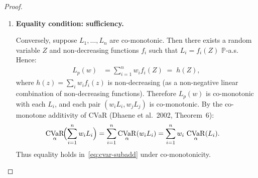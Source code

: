 \documentclass[12pt,openany]{book}
\newcommand{\Prob}{\mathbb{P}}
\newcommand{\bfw}{\mathbf{w}}
\DeclareMathOperator{\CVaR}{CVaR}
\numberwithin{equation}{chapter}
\theoremstyle{plain}
\theoremstyle{definition}
\theoremstyle{remark}
\def\bfw{w}%
\begin{document}
\begin{proof}
\begin{enumerate}[label=\textbf{Step \arabic*.}, leftmargin=*,
                  widest=Step 6., itemsep=1ex]
        Suppose equality holds in~\eqref{eq:cvar-subadd}, i.e.,
        \begin{equation}
          \CVaR_\alpha\!\bigl(L_p(\bfw)\bigr)
          \;=\; \sum_{i=1}^n w_i\,\CVaR_\alpha(L_i).
          \label{eq:cvar-equality}
        \end{equation}
        For any two integrable losses $X$, $Y$ with $w_X, w_Y > 0$,
        equality in~\eqref{eq:cvar-subadd-two} holds if and only if
        $X$ and $Y$ are co-monotonic (Theorem~6 of Dhaene et al.\
        2002).  Tracing back through the inductive
        step~\eqref{eq:cvar-inductive}, equality in each application
        of sub-additivity requires that $w_i L_i$ and
        $\sum_{j \neq i} w_j L_j$ are co-monotonic for each $i$.
        Since $w_i > 0$ (positive homogeneity is injective for
        $\lambda > 0$), this is equivalent to requiring that every
        pair $(L_i, L_j)$ with $i \neq j$ is co-monotonic,
        i.e., the entire collection $L_1,\ldots,L_n$ is co-monotonic.
        Hence equality in~\eqref{eq:cvar-subadd} implies co-monotonicity
        of $L_1,\ldots,L_n$.

        \medskip
        \noindent\textit{Edge case $w_i = 0$.}
        If $w_i = 0$ for some $i$, then asset $i$ does not
        contribute to the portfolio, and equality can hold trivially
        with respect to asset $i$ regardless of its co-monotonicity
        with other assets.  The strict inequality conclusion below
        applies to all assets with $w_i > 0$.

  \item \textbf{Equality condition: sufficiency.}

        Conversely, suppose $L_1,\ldots,L_n$ are co-monotonic.
        Then there exists a random variable $Z$ and non-decreasing
        functions $f_i$ such that $L_i = f_i(Z)$ $\Prob$-a.s.
        Hence:
        \begin{align}
          L_p(\bfw)
          &= \sum_{i=1}^n w_i f_i(Z)
          \;=\; h(Z),
          \label{eq:lp-comonotone}
        \end{align}
        where $h(z) = \sum_i w_i f_i(z)$ is non-decreasing
        (as a non-negative linear combination of non-decreasing
        functions).  Therefore $L_p(\bfw)$ is co-monotonic with
        each $L_i$, and each pair $(w_i L_i, w_j L_j)$ is
        co-monotonic.  By the co-monotone additivity of CVaR
        (Dhaene et al.\ 2002, Theorem~6):
        \begin{align}
          \CVaR_\alpha\!\Bigl(\sum_{i=1}^n w_i L_i\Bigr)
          &= \sum_{i=1}^n \CVaR_\alpha(w_i L_i)
          = \sum_{i=1}^n w_i\,\CVaR_\alpha(L_i).
          \label{eq:cvar-comonotone-add}
        \end{align}
        Thus equality holds in~\eqref{eq:cvar-subadd} under
        co-monotonicity.


\end{enumerate}
\end{proof}
\end{document}
